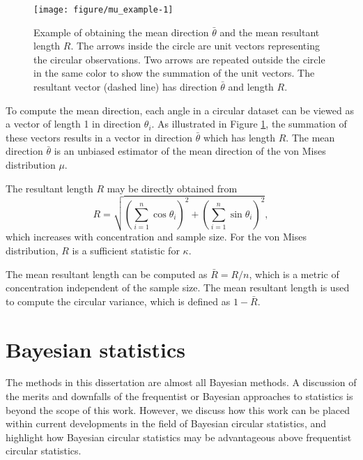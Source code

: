 \documentclass[12pt, a4paper]{book}\usepackage[]{graphicx}\usepackage{xcolor}
\newenvironment{knitrout}{}{} %
\begin{document}
\begin{figure}
\centering
\begin{knitrout}
\color{fgcolor}
\texttt{[image: figure/mu\_example-1]} 

\end{knitrout}
\caption{Example of obtaining the mean direction $\bar{\theta}$ and the mean resultant length $R$. The arrows inside the circle are unit vectors representing the circular observations. Two arrows are repeated outside the circle in the same color to show the summation of the unit vectors. The resultant vector (dashed line) has direction $\bar{\theta}$ and length $R$.}\label{exampleRMu}
\end{figure}

To compute the mean direction, each angle in a circular dataset can be viewed as a vector of length 1 in direction $\theta_i$. As illustrated in Figure \ref{exampleRMu}, the summation of these vectors results in a vector in direction $\bar{\theta}$ which has length $R$. The mean direction $\bar{\theta}$ is an unbiased estimator of the mean direction of the von Mises distribution $\mu$.

The resultant length $R$ may be directly obtained from
$$ R = \sqrt{\left(\sum_{i=1}^{n} \cos \theta_i \right)^2 + \left(\sum_{i=1}^{n} \sin \theta_i \right)^2},$$
which increases with concentration and sample size. For the von Mises distribution, $R$ is a sufficient statistic for $\kappa$.

The mean resultant length can be computed as $\bar{R} = R/n$, which is a metric of concentration independent of the sample size. The mean resultant length is used to compute the circular variance, which is defined as $1 - \bar{R}.$





\section*{Bayesian statistics}

The methods in this dissertation are almost all Bayesian methods. A discussion of the merits and downfalls of the frequentist or Bayesian approaches to statistics is beyond the scope of this work. However, we discuss how this work can be placed within current developments in the field of Bayesian circular statistics, and highlight how Bayesian circular statistics may be advantageous above frequentist circular statistics.
\end{document}
